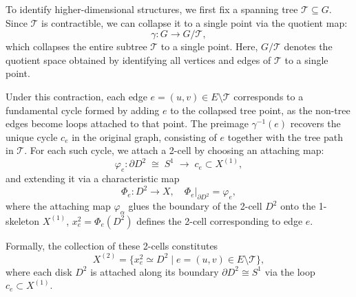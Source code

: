 To identify higher-dimensional structures, we first fix a spanning tree \(\mathcal{T} \subseteq G\). Since \(\mathcal{T}\) is contractible, we can collapse it to a single point via the quotient map:
\begin{equation}
\gamma : G \to G / \mathcal{T},
\end{equation}
which collapses the entire subtree \(\mathcal{T}\) to a single point. Here, \(G / \mathcal{T}\) denotes the quotient space obtained by identifying all vertices and edges of \(\mathcal{T}\) to a single point. 

Under this contraction, each edge \( e = (u,v) \in E \setminus \mathcal{T} \) corresponds to a fundamental cycle formed by adding \(e\) to the collapsed tree point, as the non-tree edges become loops attached to that point. The preimage $\gamma^{-1}(e)$ recovers the unique cycle $c_e$ in the original graph, consisting of $e$ together with the tree path in $\mathcal{T}$. For each such cycle, we attach a 2-cell by choosing an attaching map:
\begin{equation}
\varphi_e : \partial D^2 \;\cong\; S^1 \;\longrightarrow\; c_e \subset X^{(1)},
\end{equation}
and extending it via a characteristic map
\[
\Phi_e : D^2 \longrightarrow X, \quad 
\Phi_e|_{\partial D^2} = \varphi_e,
\]
where the attaching map
\(
\varphi_\alpha
\)
 glues the boundary of the 2-cell \(D^2\) onto the 1-skeleton \(X^{(1)}\), $x^2_e = \Phi_e(D^2)$ 
defines the 2-cell corresponding to edge \( e \).


Formally, the collection of these 2-cells constitutes
\begin{equation}
X^{(2)} = \{ x^2_e \simeq D^2 \mid e = (u,v) \in E \setminus \mathcal{T} \},
\end{equation}
where each disk \(D^2\) is attached along its boundary \(\partial D^2 \cong S^1\) via the loop \(c_e \subset X^{(1)}\). %

